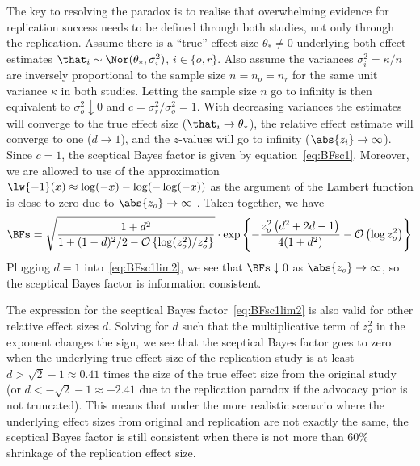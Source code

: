 The key to resolving the paradox is to realise that overwhelming evidence for
replication success needs to be defined through both studies, not only through
the replication. Assume there is a ``true'' effect size $\theta_{*} \neq 0$
underlying both effect estimates
$\that_{i} \sim \Nor(\theta_{*}, \sigma_{i}^{2})$, $i \in \{o, r\}$. Also assume
the variances $\sigma_{i}^{2} = \kappa/n$ are inversely proportional to the
sample size $n = n_{o} = n_{r}$ for the same unit variance $\kappa$ in both
studies. Letting the sample size $n$ go to infinity is then equivalent to
$\sigma_{o}^{2} \downarrow 0$ and $c = \sigma^{2}_{r}/\sigma^{2}_{o} = 1$. With
decreasing variances the estimates will
converge to the true effect size ($\that_{i} \to \theta_{*}$), the relative
effect estimate will converge to one ($d \to 1$), and the $z$-values will go to
infinity ($\abs{z_{i}} \to \infty$). Since $c = 1$, the sceptical Bayes factor
is given by equation~\eqref{eq:BFsc1}. Moreover, we are allowed to use of the
approximation $\lw{-1}(x) \approx \log(-x) - \log(-\log(-x))$ as the argument of
the Lambert function is close to zero due to $\abs{z_{o}} \to \infty$ \citep[p.
350]{Corless1996}. Taken together, we have
\begin{align}
  \label{eq:BFsc1lim2}
  \BFs =
  \sqrt{\frac{1 + d^{2}}{1 + (1 - d)^{2}/2 -
\mathcal{O}\left\{\log(z_{o}^{2})/z_{o}^{2}\right\}}} \cdot
  \exp\left\{-\frac{z_o^2\left(d^{2} + 2d - 1 \right)}{4(1 + d^{2})}
- \mathcal{O}\left(\log z_{o}^{2}\right)\right\}
\end{align}
Plugging $d = 1$ into~\eqref{eq:BFsc1lim2}, we see that $\BFs \downarrow 0$ as
$\abs{z_{o}} \to \infty$, so the sceptical Bayes factor is information
consistent.

The expression for the sceptical Bayes factor~\eqref{eq:BFsc1lim2} is also valid
for other relative effect sizes $d$. Solving for $d$ such that the
multiplicative term of $z_{o}^{2}$ in the exponent changes the sign, we see that
the sceptical Bayes factor goes to zero when the underlying true effect size of
the replication study is at least
$d > \sqrt{2} - 1 \approx 0.41$ times the size of the
true effect size from the original study (or
$d < -\sqrt{2} - 1 \approx -2.41$ due to the
replication paradox if the advocacy prior is not truncated). This means that
under the more realistic scenario where the underlying effect sizes from
original and replication are not exactly the same, the sceptical Bayes factor is
still consistent when there is not more than 60\% shrinkage of the replication
effect size.


